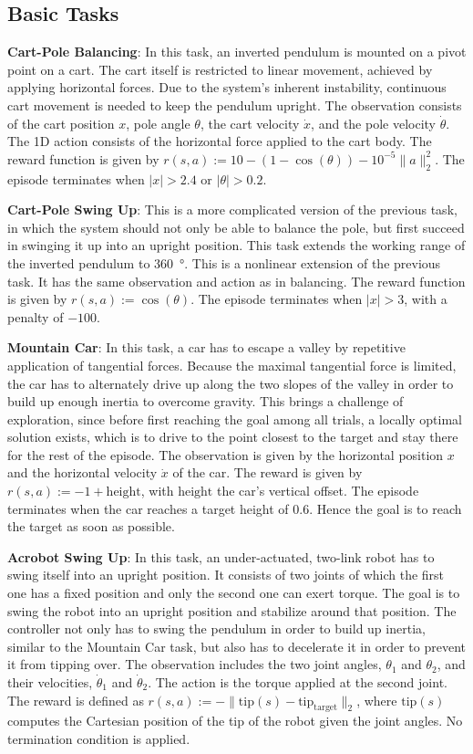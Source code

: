 \documentclass{article}
\newcommand{\norm}[1]{\|#1\|}\clearpage{}
\begin{document}
\subsection{Basic Tasks}

{\bf Cart-Pole Balancing}: In this task, an inverted pendulum is mounted on a pivot point on a cart. The cart itself is restricted to linear movement, achieved by applying horizontal forces. Due to the system's inherent instability, continuous cart movement is needed to keep the pendulum upright. The observation consists of the cart position $x$, pole angle $\theta$, the cart velocity $\dot x$, and the pole velocity $\dot\theta$. The 1D action consists of the horizontal force applied to the cart body. The reward function is given by 
$r(s, a) := 10 - (1 - \cos(\theta)) - 10^{-5} \norm{a}_2^2$. The episode terminates when $|x| > 2.4$ or $|\theta| > 0.2$.

{\bf Cart-Pole Swing Up}: This is a more complicated version of the previous task, in which the system should not only be able to balance the pole, but first succeed in swinging it up into an upright position. This task extends the working range of the inverted pendulum to \SI{360}{\degree}. This is a nonlinear extension of the previous task. It has the same observation and action as in balancing. The reward function is given by $r(s, a) := \cos(\theta)$. The episode terminates when $|x| > 3$, with a penalty of $-100$.

{\bf Mountain Car}: In this task, a car has to escape a valley by repetitive application of tangential forces. Because the maximal tangential force is limited, the car has to alternately drive up along the two slopes of the valley in order to build up enough inertia to overcome gravity. This brings a challenge of exploration, since before first reaching the goal among all trials, a locally optimal solution exists, which is to drive to the point closest to the target and stay there for the rest of the episode. The observation is given by the horizontal position $x$ and the horizontal velocity $\dot x$ of the car. The reward is given by $r(s, a) := -1 + \textrm{height}$, with $\textrm{height}$ the car's vertical offset. The episode terminates when the car reaches a target height of $0.6$. Hence the goal is to reach the target as soon as possible.

{\bf Acrobot Swing Up}: In this task, an under-actuated, two-link robot has to swing itself into an upright position. It consists of two joints of which the first one has a fixed position and only the second one can exert torque. The goal is to swing the robot into an upright position and stabilize around that position. The controller not only has to swing the pendulum in order to build up inertia, similar to the Mountain Car task, but also has to decelerate it in order to prevent it from tipping over. The observation includes the two joint angles, $\theta_1$ and $\theta_2$, and their velocities, $\dot\theta_1$ and $\dot\theta_2$. The action is the torque applied at the second joint. The reward is defined as $r(s, a) := -\norm{\mathrm{tip}(s) - \mathrm{tip}_{\mathrm{target}}}_2$, where $\mathrm{tip}(s)$ computes the Cartesian position of the tip of the robot given the joint angles. No termination condition is applied.
\end{document}
